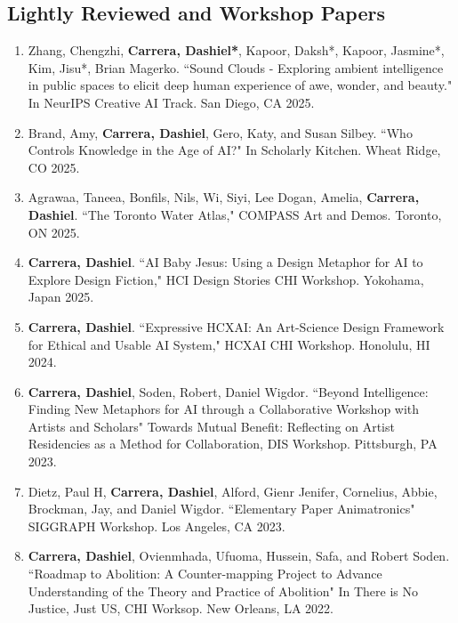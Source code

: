 \subsection{Lightly Reviewed and Workshop Papers}
\begin{enumerate}

\item Zhang, Chengzhi, \textbf{Carrera, Dashiel*}, Kapoor, Daksh*, Kapoor, Jasmine*, Kim, Jisu*, Brian Magerko. ``Sound Clouds - Exploring ambient intelligence in public spaces to elicit deep human experience of awe, wonder, and beauty." In NeurIPS Creative AI Track. San Diego, CA 2025.

 \item Brand, Amy, \textbf{Carrera, Dashiel}, Gero, Katy, and Susan Silbey. ``Who Controls Knowledge in the Age of AI?" In Scholarly Kitchen. Wheat Ridge, CO 2025. \\
 \item Agrawaa, Taneea, Bonfils, Nils, Wi, Siyi, Lee Dogan, Amelia, \textbf{Carrera, Dashiel}. ``The Toronto Water Atlas," COMPASS Art and Demos. Toronto, ON 2025. \\
 \item \textbf{Carrera, Dashiel}. ``AI Baby Jesus: Using a Design Metaphor for AI to Explore Design Fiction," HCI Design Stories CHI Workshop. Yokohama, Japan 2025. \\
 \item \textbf{Carrera, Dashiel}. ``Expressive HCXAI: An Art-Science Design Framework for Ethical and Usable AI System," HCXAI CHI Workshop. Honolulu, HI 2024. \\
  \item \textbf{Carrera, Dashiel}, Soden, Robert, Daniel Wigdor. ``Beyond Intelligence: Finding New Metaphors for AI through a Collaborative Workshop with Artists and Scholars" Towards Mutual Benefit: Reflecting on Artist Residencies as a Method for Collaboration, DIS Workshop. Pittsburgh, PA 2023. \\
   \item  Dietz, Paul H, \textbf{Carrera, Dashiel}, Alford, Gienr Jenifer, Cornelius, Abbie, Brockman, Jay, and Daniel Wigdor. ``Elementary Paper Animatronics" SIGGRAPH Workshop. Los Angeles, CA 2023. \\
  \item \textbf{Carrera, Dashiel}, Ovienmhada, Ufuoma, Hussein, Safa, and Robert Soden. ``Roadmap to Abolition: A Counter-mapping Project to Advance Understanding of the Theory and Practice of Abolition" In There is No Justice, Just US, CHI Worksop. New Orleans, LA 2022. 
  \end{enumerate}
  



